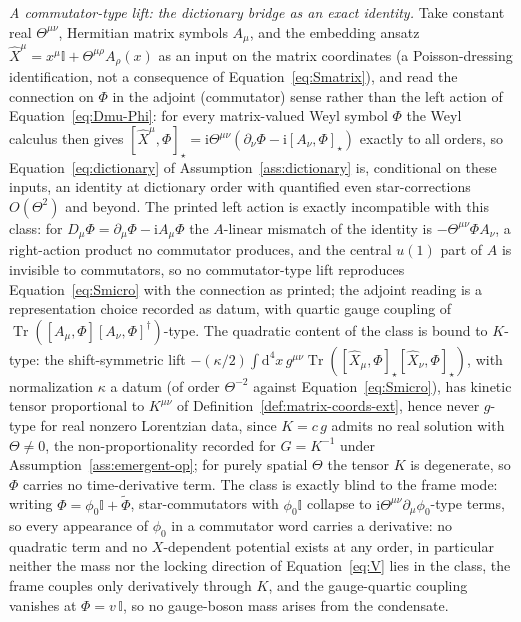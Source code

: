 \emph{A commutator-type lift: the dictionary bridge as an exact identity.} Take constant real \(\Theta^{\mu\nu}\), Hermitian matrix symbols \(A_\mu\), and the embedding ansatz \(\hat X^\mu=x^\mu\mathbb I+\Theta^{\mu\rho}A_\rho(x)\) as an input on the matrix coordinates (a Poisson-dressing identification, not a consequence of Equation~\eqref{eq:Smatrix}), and read the connection on \(\Phi\) in the adjoint (commutator) sense rather than the left action of Equation~\eqref{eq:Dmu-Phi}: for every matrix-valued Weyl symbol \(\Phi\) the Weyl calculus then gives \([\hat X^\mu,\Phi]_\star=\mathrm i\Theta^{\mu\nu}(\partial_\nu\Phi-\mathrm i[A_\nu,\Phi]_\star)\) exactly to all orders, so Equation~\eqref{eq:dictionary} of Assumption~\ref{ass:dictionary} is, conditional on these inputs, an identity at dictionary order with quantified even star-corrections \(O(\Theta^2)\) and beyond.
The printed left action is exactly incompatible with this class: for \(D_\mu\Phi=\partial_\mu\Phi-\mathrm iA_\mu\Phi\) the \(A\)-linear mismatch of the identity is \(-\Theta^{\mu\nu}\Phi A_\nu\), a right-action product no commutator produces, and the central \(u(1)\) part of \(A\) is invisible to commutators, so no commutator-type lift reproduces Equation~\eqref{eq:Smicro} with the connection as printed; the adjoint reading is a representation choice recorded as datum, with quartic gauge coupling of \(\operatorname{Tr}([A_\mu,\Phi][A_\nu,\Phi]^\dagger)\)-type.
The quadratic content of the class is bound to \(K\)-type: the shift-symmetric lift \(-(\kappa/2)\int\mathrm d^4x\,g^{\mu\nu}\operatorname{Tr}([\hat X_\mu,\Phi]_\star[\hat X_\nu,\Phi]_\star)\), with normalization \(\kappa\) a datum (of order \(\Theta^{-2}\) against Equation~\eqref{eq:Smicro}), has kinetic tensor proportional to \(K^{\mu\nu}\) of Definition~\ref{def:matrix-coords-ext}, hence never \(g\)-type for real nonzero Lorentzian data, since \(K=c\,g\) admits no real solution with \(\Theta\neq0\), the non-proportionality recorded for \(G=K^{-1}\) under Assumption~\ref{ass:emergent-op}; for purely spatial \(\Theta\) the tensor \(K\) is degenerate, so \(\Phi\) carries no time-derivative term.
The class is exactly blind to the frame mode: writing \(\Phi=\phi_0\mathbb I+\tilde\Phi\), star-commutators with \(\phi_0\mathbb I\) collapse to \(\mathrm i\Theta^{\mu\nu}\partial_\mu\phi_0\)-type terms, so every appearance of \(\phi_0\) in a commutator word carries a derivative: no quadratic term and no \(X\)-dependent potential exists at any order, in particular neither the mass nor the locking direction of Equation~\eqref{eq:V} lies in the class, the frame couples only derivatively through \(K\), and the gauge-quartic coupling vanishes at \(\Phi=v\,\mathbb I\), so no gauge-boson mass arises from the condensate.

